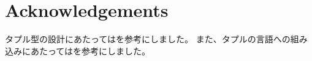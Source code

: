 \documentclass{jsarticle}
\begin{document}
\newpage



\section*{Acknowledgements}

タプル型の設計にあたっては\citet{pierce2002types}を参考にしました。
また、タプルの言語への組み込みにあたっては\citet{oliveira2015modular}を参考にしました。





\end{document}
